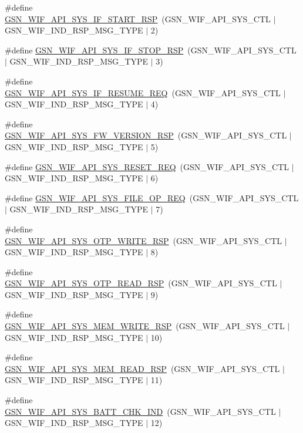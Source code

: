 \begin{DoxyCompactItemize}
\item 
\#define \hyperlink{a00606_a211bdbcd29b041f76e896a89fe48cd33}{GSN\_\-WIF\_\-API\_\-SYS\_\-IF\_\-START\_\-RSP}~(GSN\_\-WIF\_\-API\_\-SYS\_\-CTL $|$ GSN\_\-WIF\_\-IND\_\-RSP\_\-MSG\_\-TYPE $|$ 2)
\item 
\#define \hyperlink{a00606_a1846f96406c429a8ecf8cb1b11c81f71}{GSN\_\-WIF\_\-API\_\-SYS\_\-IF\_\-STOP\_\-RSP}~(GSN\_\-WIF\_\-API\_\-SYS\_\-CTL $|$ GSN\_\-WIF\_\-IND\_\-RSP\_\-MSG\_\-TYPE $|$ 3)
\item 
\#define \hyperlink{a00606_aba7166569706b2885be26e10411fbdf5}{GSN\_\-WIF\_\-API\_\-SYS\_\-IF\_\-RESUME\_\-REQ}~(GSN\_\-WIF\_\-API\_\-SYS\_\-CTL $|$ GSN\_\-WIF\_\-IND\_\-RSP\_\-MSG\_\-TYPE $|$ 4)
\item 
\#define \hyperlink{a00606_ae890eabe1132a01ac9aa6ef5d5ee105e}{GSN\_\-WIF\_\-API\_\-SYS\_\-FW\_\-VERSION\_\-RSP}~(GSN\_\-WIF\_\-API\_\-SYS\_\-CTL $|$ GSN\_\-WIF\_\-IND\_\-RSP\_\-MSG\_\-TYPE $|$ 5)
\item 
\#define \hyperlink{a00606_a23247938aa161b346fd923ce298740fa}{GSN\_\-WIF\_\-API\_\-SYS\_\-RESET\_\-REQ}~(GSN\_\-WIF\_\-API\_\-SYS\_\-CTL $|$ GSN\_\-WIF\_\-IND\_\-RSP\_\-MSG\_\-TYPE $|$ 6)
\item 
\#define \hyperlink{a00606_a75f465637f58de98ccf4e13109751193}{GSN\_\-WIF\_\-API\_\-SYS\_\-FILE\_\-OP\_\-REQ}~(GSN\_\-WIF\_\-API\_\-SYS\_\-CTL $|$ GSN\_\-WIF\_\-IND\_\-RSP\_\-MSG\_\-TYPE $|$ 7)
\item 
\#define \hyperlink{a00606_a915a87e97514aa78bc1fc481fa52fb13}{GSN\_\-WIF\_\-API\_\-SYS\_\-OTP\_\-WRITE\_\-RSP}~(GSN\_\-WIF\_\-API\_\-SYS\_\-CTL $|$ GSN\_\-WIF\_\-IND\_\-RSP\_\-MSG\_\-TYPE $|$ 8)
\item 
\#define \hyperlink{a00606_a68daa74a2f5d9dd92261db9b44ea3b04}{GSN\_\-WIF\_\-API\_\-SYS\_\-OTP\_\-READ\_\-RSP}~(GSN\_\-WIF\_\-API\_\-SYS\_\-CTL $|$ GSN\_\-WIF\_\-IND\_\-RSP\_\-MSG\_\-TYPE $|$ 9)
\item 
\#define \hyperlink{a00606_a697f00db1242d9669dad03f339dee38a}{GSN\_\-WIF\_\-API\_\-SYS\_\-MEM\_\-WRITE\_\-RSP}~(GSN\_\-WIF\_\-API\_\-SYS\_\-CTL $|$ GSN\_\-WIF\_\-IND\_\-RSP\_\-MSG\_\-TYPE $|$ 10)
\item 
\#define \hyperlink{a00606_a19bf52f5120153a8453dd90dab2e78b4}{GSN\_\-WIF\_\-API\_\-SYS\_\-MEM\_\-READ\_\-RSP}~(GSN\_\-WIF\_\-API\_\-SYS\_\-CTL $|$ GSN\_\-WIF\_\-IND\_\-RSP\_\-MSG\_\-TYPE $|$ 11)
\item 
\#define \hyperlink{a00606_ab78c1ca62426417801be036f56d808fc}{GSN\_\-WIF\_\-API\_\-SYS\_\-BATT\_\-CHK\_\-IND}~(GSN\_\-WIF\_\-API\_\-SYS\_\-CTL $|$ GSN\_\-WIF\_\-IND\_\-RSP\_\-MSG\_\-TYPE $|$ 12)

\end{DoxyCompactItemize}
